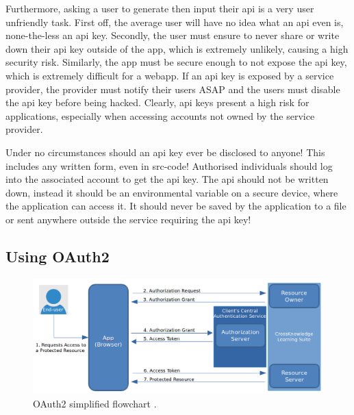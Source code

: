 \documentclass[11pt]{article}
\begin{document}
Furthermore, asking a \gls{user} to generate then input their \acrshort{api} is a very user unfriendly task. First off, the average user will have no idea what an \acrshort{api} even is, none-the-less an \acrshort{api} key. Secondly, the user must ensure to never share or write down their \acrshort{api} key outside of the app, which is extremely unlikely, causing a high security risk. Similarly, the app must be secure enough to not expose the \acrshort{api} key, which is extremely difficult for a \gls{webapp}. If an \acrshort{api} key is exposed by a service provider, the provider must notify their users ASAP and the users must disable the \acrshort{api} key before being hacked. Clearly, \acrshort{api} keys present a high risk for applications, especially when accessing accounts not owned by the service provider.

\begin{warn}
Under no circumstances should an \acrshort{api} key ever be disclosed to anyone! This includes any written form, even in \gls{src-code}! Authorised individuals should log into the associated account to get the \acrshort{api} key. The \acrshort{api} should not be written down, instead it should be an environmental variable on a secure device, where the application can access it. It should never be saved by the application to a file or sent anywhere outside the service requiring the \acrshort{api} key!
\end{warn}

\subsection{Using OAuth2}

\begin{figure}[b!]
    \centering
    \includegraphics[width=\textwidth]{figures/oauth2workflow.png}
    \caption{OAuth2 simplified flowchart \cite{oauth2-fig}.}
    \label{fig:oauth-flowchart}
\end{figure}
\end{document}
